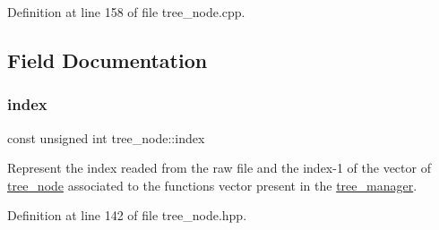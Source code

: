 Definition at line 158 of file tree\+\_\+node.\+cpp.



\subsection{Field Documentation}
\mbox{\label{classtree__node_ac036ae7a6a4594d3052b9a29045464ca}} 
\subsubsection{\texorpdfstring{index}{index}}
{\footnotesize\ttfamily const unsigned int tree\+\_\+node\+::index}



Represent the index readed from the raw file and the index-\/1 of the vector of \hyperlink{classtree__node}{tree\+\_\+node} associated to the functions vector present in the \hyperlink{classtree__manager}{tree\+\_\+manager}. 



Definition at line 142 of file tree\+\_\+node.\+hpp.



